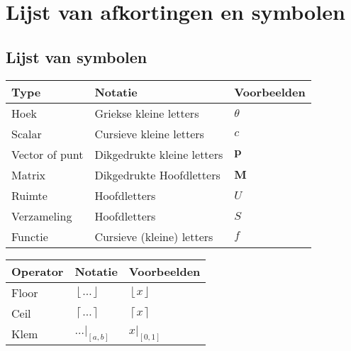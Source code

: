 \documentclass[master=cws, masteroption=mmc]{kulemt}
\renewcommand{\arraystretch}{1.3}
\begin{document}
  
  \tableofcontents*
  

  \listoffiguresandtables
\chapter{Lijst van afkortingen en symbolen}
\section*{Lijst van symbolen}
  \renewcommand{\arraystretch}{1.5}
  \begin{table}[ht]
  \begin{tabular}{@{}lll@{}}%
    Type           & Notatie                    & Voorbeelden  \\ \midrule
    Hoek           & Griekse kleine letters     & $\theta$     \\
    Scalar         & Cursieve kleine letters    & $\mathit{c}$ \\
    Vector of punt & Dikgedrukte kleine letters & $\mathbf{p}$ \\
    Matrix         & Dikgedrukte Hoofdletters   & $\mathbf{M}$ \\
    Ruimte         & Hoofdletters               & $U$          \\
    Verzameling    & Hoofdletters               & $S$          \\
    Functie        & Cursieve (kleine) letters  & $\mathit{f}$ \\ %
  \end{tabular}
  \label{tab:symbolen}
  \end{table}
\begin{table}[ht]
  \begin{tabular}{@{}lll@{}}%
    Operator       & Notatie        & Voorbeelden \\ \midrule
    Floor          & $\left \lfloor{\dots}\right \rfloor$ & $\left \lfloor{x}\right \rfloor$\\
    Ceil           & $\left \lceil{\dots}\right \rceil$ & $\left \lceil{x}\right \rceil$\\
    Klem           & $\dots|_{[a,b]}$ & $x|_{[0, 1]}$ \\ %
  \end{tabular}
  \label{tbl:math-operators}
\end{table}
\end{document}
